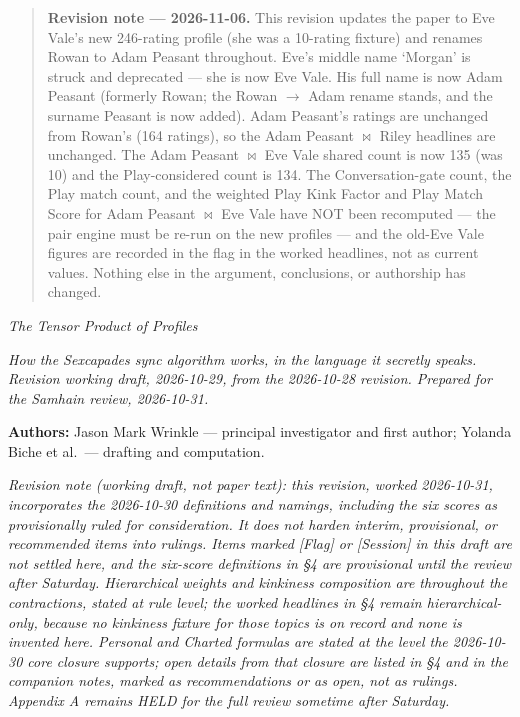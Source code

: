 \begin{quote}
\textbf{Revision note --- 2026-11-06.} This revision updates the paper
to Eve Vale's new 246-rating profile (she was a 10-rating fixture) and
renames Rowan to Adam Peasant throughout. Eve's middle name `Morgan' is
struck and deprecated --- she is now Eve Vale. His full name is now Adam
Peasant (formerly Rowan; the Rowan $\rightarrow$ Adam rename stands, and the surname
Peasant is now added). Adam Peasant's ratings are unchanged from Rowan's
(164 ratings), so the Adam Peasant $\bowtie$ Riley headlines are unchanged. The
Adam Peasant $\bowtie$ Eve Vale shared count is now 135 (was 10) and the
Play-considered count is 134. The Conversation-gate count, the Play
match count, and the weighted Play Kink Factor and Play Match Score for
Adam Peasant $\bowtie$ Eve Vale have NOT been recomputed --- the pair engine
must be re-run on the new profiles --- and the old-Eve Vale figures are
recorded in the flag in the worked headlines, not as current values.
Nothing else in the argument, conclusions, or authorship has changed.
\end{quote}

\emph{The Tensor Product of Profiles}

\emph{How the Sexcapades sync algorithm works, in the language it
secretly speaks. Revision working draft, 2026-10-29, from the 2026-10-28
revision. Prepared for the Samhain review, 2026-10-31.}

\textbf{Authors:} Jason Mark Wrinkle --- principal investigator and
first author; Yolanda Biche et al.~--- drafting and computation.

\emph{Revision note (working draft, not paper text): this revision,
worked 2026-10-31, incorporates the 2026-10-30 definitions and namings,
including the six scores as provisionally ruled for consideration. It
does not harden interim, provisional, or recommended items into rulings.
Items marked {[}Flag{]} or {[}Session{]} in this draft are not settled
here, and the six-score definitions in \S 4 are provisional until the
review after Saturday. Hierarchical weights and kinkiness composition
are throughout the contractions, stated at rule level; the worked
headlines in \S 4 remain hierarchical-only, because no kinkiness fixture
for those topics is on record and none is invented here. Personal and
Charted formulas are stated at the level the 2026-10-30 core closure
supports; open details from that closure are listed in \S 4 and in the
companion notes, marked as recommendations or as open, not as rulings.
Appendix A remains HELD for the full review sometime after Saturday.}

